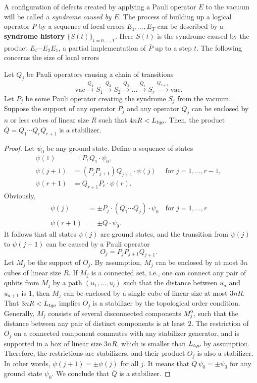 A configuration of defects created by applying a Pauli operator $E$ to the vacuum
will be called a {\em syndrome caused by $E$}.
The process of building up a logical operator $\overline{P}$ 
by a sequence of local errors $E_1,\ldots,E_T$ can be described by
a {\bf syndrome history} $\{S(t)\}_{t=0,\ldots,T}$.
Here $S(t)$ is the syndrome caused by the product $E_t \cdots E_2 E_1$,
a partial implementation of $\overline{P}$ up to a step $t$.
The following concerns the size of local errors
\begin{lem}
\label{lem:large-support-for-nontrivial-transition}
Let $Q_j$ be Pauli operators causing  a chain of transitions
\[
\mathrm{vac} \xrightarrow{Q_1} S_1 \xrightarrow{Q_2}  S_2 \xrightarrow{Q_3} \ldots \xrightarrow{Q_r} S_r
\xrightarrow{Q_{r+1}} \mathrm{vac}.
\]
Let $P_j$ be some Pauli operator creating the syndrome $S_j$ from the vacuum.
Suppose the support of any operator $P_j$ and any operator $Q_j$
can be enclosed by $n$ or less cubes of linear size $R$ such that $4nR < {L_{tqo}}$.
Then, the product $\overline{Q} = Q_1\cdots Q_r Q_{r+1}$ is a stabilizer.
\end{lem}
\begin{proof}
Let $\psi_0$ be any ground state.
Define a sequence of states
\begin{align*}
\psi(1) &= P_1 Q_1\cdot \psi_0, \\
\psi(j+1) &=  (P_j P_{j+1}) Q_{j+1} \cdot \psi(j) \quad \text{ for $j=1,\ldots,r-1$},\\
\psi(r+1) &= Q_{r+1} P_{r} \cdot \psi(r).
\end{align*}
Obviously,
\begin{align*}
\psi(j) &= \pm P_j \cdot (Q_1 \cdots Q_j) \cdot  \psi_0 \quad \text{for $j=1,\ldots,r$} \\
\psi(r+1) &= \pm \overline{Q}\cdot \psi_0.
\end{align*}
It follows that all states $\psi(j)$ are ground states,
and the transition from $\psi(j)$ to $\psi(j+1)$ 
can be caused by a Pauli operator
\[
O_j = P_j P_{j+1} Q_{j+1}.
\]
Let $M_j$ be the support of $O_j$. 
By assumption, $M_j$ can be enclosed by at most $3n$ cubes of linear size $R$.
If $M_j$ is a connected set,
i.e., one can connect any pair of qubits from $M_j$ by a path $(u_1,\ldots,u_l)$
such that the distance between $u_a$ and $u_{a+1}$ is $1$,
then $M_j$ can be enclosed by a single cube of linear size at most $3nR$.
That $3nR < {L_{tqo}}$ implies $O_j$ is a stabilizer by the topological order condition.
Generally, $M_j$ consists of several disconnected components $M_j^\alpha$,
such that the distance between any pair of distinct components is at least $2$.
The restriction of $O_j$ on a connected component 
commutes with any stabilizer generator,
and is supported in a box of linear size $3nR$,
which is smaller than ${L_{tqo}}$ by assumption.
Therefore, the restrictions are stabilizers,
and their product $O_j$ is also a stabilizer.
In other words, $\psi(j+1)=\pm \psi(j)$ for all $j$.
It means that $\overline{Q}\, \psi_0 = \pm \psi_0$ for any ground state $\psi_0$.
We conclude that $\overline{Q}$ is a stabilizer.
\end{proof}



